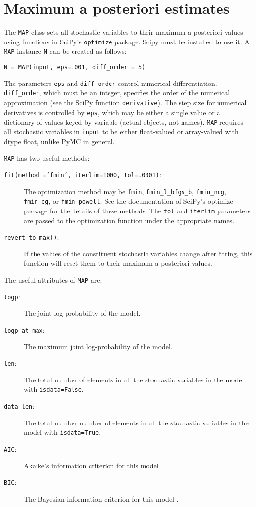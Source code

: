 \section{Maximum a posteriori estimates} 

The \texttt{MAP} class sets all stochastic variables to their maximum a posteriori values using functions in SciPy's \texttt{optimize} package. Scipy must be installed to use it. A \texttt{MAP} instance \texttt{N} can be created as follows:
\begin{verbatim}
N = MAP(input, eps=.001, diff_order = 5)    
\end{verbatim}
The parameters \texttt{eps} and \texttt{diff_order} control numerical differentiation. \texttt{diff_order}, which must be an integer, specifies the order of the numerical approximation (see the SciPy function \texttt{derivative}). The step size for numerical derivatives is controlled by \texttt{eps}, which may be either a single value or a dictionary of values keyed by variable (actual objects, not names). \texttt{MAP} requires all stochastic variables in \texttt{input} to be either float-valued or array-valued with dtype float, unlike PyMC in general.

\texttt{MAP} has two useful methods:
\begin{description}
    \item[\texttt{fit(method ='fmin', iterlim=1000, tol=.0001)}:] The optimization method may be \texttt{fmin}, \texttt{fmin_l_bfgs_b}, \texttt{fmin_ncg}, \texttt{fmin_cg}, or \texttt{fmin_powell}. See the documentation of SciPy's optimize package for the details of these methods. The \texttt{tol} and \texttt{iterlim} parameters are passed to the optimization function under the appropriate names.
    \item[\texttt{revert_to_max()}:] If the values of the constituent stochastic variables change after fitting, this function will reset them to their maximum a posteriori values.
\end{description}

The useful attributes of \texttt{MAP} are:
\begin{description}
    \item[\texttt{logp}:] The joint log-probability of the model.
    \item[\texttt{logp_at_max}:] The maximum joint log-probability of the model.
    \item[\texttt{len}:] The total number of elements in all the stochastic variables in the model with \texttt{isdata=False}.
    \item[\texttt{data_len}:] The total number number of elements in all the stochastic variables in the model with \texttt{isdata=True}.
    \item[\texttt{AIC}:] Akaike's information criterion for this model \cite{Akaike:1973aj,Burnham:2002ic}.
    \item[\texttt{BIC}:] The Bayesian information criterion for this model \cite{Schwarz:1978ud}.
\end{description}

